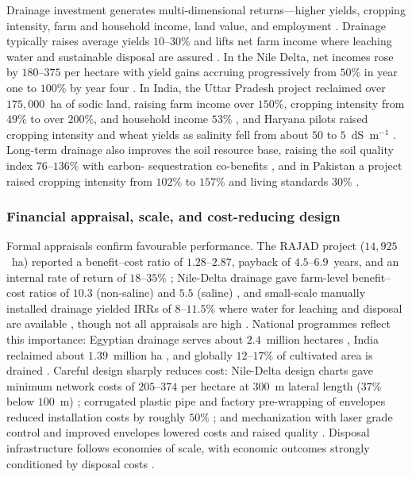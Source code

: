 \documentclass[11pt]{article}
\begin{document}
Drainage investment generates multi-dimensional returns---higher yields, cropping
intensity, farm and household income, land value, and employment
\parencite{Gopalakrishnan2007,AbdelDayem2007}. Drainage typically raises average
yields $10$--$30\%$ and lifts net farm income where leaching water and
sustainable disposal are assured \parencite{AbdelDayem2007,Datta2000,Wichelns2002}.
In the Nile Delta, net incomes rose by $180$--$375$ per hectare with yield gains
accruing progressively from $50\%$ in year one to $100\%$ by year four
\parencite{Wichelns2002}. In India, the Uttar Pradesh project reclaimed over
$175{,}000$~ha of sodic land, raising farm income over $150\%$, cropping
intensity from $49\%$ to over $200\%$, and household income $53\%$
\parencite{Gopalakrishnan2007}, and Haryana pilots raised cropping intensity and
wheat yields as salinity fell from about $50$ to $5$~dS~m$^{-1}$
\parencite{Datta2002,Datta2000}. Long-term drainage also improves the soil
resource base, raising the soil quality index $76$--$136\%$ with carbon-
sequestration co-benefits \parencite{Mukhopadhyay2023,Mukhopadhyay2023b}, and in
Pakistan a project raised cropping intensity from $102\%$ to $157\%$ and living
standards $30\%$ \parencite{Ghumman2011}.

\subsubsection{Financial appraisal, scale, and cost-reducing design}

Formal appraisals confirm favourable performance. The RAJAD project
($14{,}925$~ha) reported a benefit--cost ratio of $1.28$--$2.87$, payback of
$4.5$--$6.9$~years, and an internal rate of return of $18$--$35\%$
\parencite{Gopalakrishnan2007}; Nile-Delta drainage gave farm-level benefit--cost
ratios of $10.3$ (non-saline) and $5.5$ (saline) \parencite{Wichelns2002}, and
small-scale manually installed drainage yielded IRRs of $8$--$11.5\%$ where water
for leaching and disposal are available \parencite{Datta2000,Datta2002}, though
not all appraisals are high \parencite{Ghumman2011}.
National programmes reflect this importance: Egyptian drainage serves about
$2.4$~million hectares \parencite{AbdelDayem2007}, India reclaimed about
$1.39$~million ha \parencite{Gopalakrishnan2007}, and globally $12$--$17\%$ of
cultivated area is drained \parencite{Valipour2014}. Careful design
sharply reduces cost: Nile-Delta design charts gave minimum network costs of
$205$--$374$ per hectare at $300$~m lateral length ($37\%$ below $100$~m)
\parencite{Gabr2024}; corrugated plastic pipe and factory pre-wrapping of
envelopes reduced installation costs by roughly $50\%$ \parencite{Yannopoulos2020};
and mechanization with laser grade control and improved envelopes lowered costs
and raised quality \parencite{Ritzema2006,Ritzema2007,TeKrony2004}. Disposal
infrastructure follows economies of scale, with economic outcomes strongly
conditioned by disposal costs \parencite{Singh2001,Bethune2008,HANSON1994,Napierala2024}.
\end{document}
